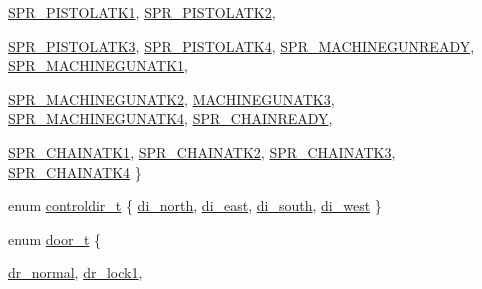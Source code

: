 \begin{DoxyCompactItemize}
\hyperlink{WL__DEF_8H_a99fb83031ce9923c84392b4e92f956b5a3affc11363641bc80d7cc3fbcb9360f4}{SPR\_\-PISTOLATK1}, 
\hyperlink{WL__DEF_8H_a99fb83031ce9923c84392b4e92f956b5a73d35c87d00688985705d0f253f0c116}{SPR\_\-PISTOLATK2}, 
\par
\hyperlink{WL__DEF_8H_a99fb83031ce9923c84392b4e92f956b5afd2c6d43c554d7138673409e5e967cee}{SPR\_\-PISTOLATK3}, 
\hyperlink{WL__DEF_8H_a99fb83031ce9923c84392b4e92f956b5a29b5998a34cf83a8de05db01d9563b8b}{SPR\_\-PISTOLATK4}, 
\hyperlink{WL__DEF_8H_a99fb83031ce9923c84392b4e92f956b5a20895a1570e42d747e9af73ea9748463}{SPR\_\-MACHINEGUNREADY}, 
\hyperlink{WL__DEF_8H_a99fb83031ce9923c84392b4e92f956b5a7c25cc9d5d11185b05590be571c92fe1}{SPR\_\-MACHINEGUNATK1}, 
\par
\hyperlink{WL__DEF_8H_a99fb83031ce9923c84392b4e92f956b5a60c85acce46c9397c50a987fd9695932}{SPR\_\-MACHINEGUNATK2}, 
\hyperlink{WL__DEF_8H_a99fb83031ce9923c84392b4e92f956b5a0a1b3f755ab756458ee2aab3ad418d6a}{MACHINEGUNATK3}, 
\hyperlink{WL__DEF_8H_a99fb83031ce9923c84392b4e92f956b5a05787c4bee4e43314d31cde46cf66875}{SPR\_\-MACHINEGUNATK4}, 
\hyperlink{WL__DEF_8H_a99fb83031ce9923c84392b4e92f956b5a7538fd8a558554269aedc541a947e044}{SPR\_\-CHAINREADY}, 
\par
\hyperlink{WL__DEF_8H_a99fb83031ce9923c84392b4e92f956b5a60783754979f8c1536cc4bb70354f6cb}{SPR\_\-CHAINATK1}, 
\hyperlink{WL__DEF_8H_a99fb83031ce9923c84392b4e92f956b5a02777882b791dfc067d9b1663e47b774}{SPR\_\-CHAINATK2}, 
\hyperlink{WL__DEF_8H_a99fb83031ce9923c84392b4e92f956b5a072a8ebea9630875c44313b59d26fc5a}{SPR\_\-CHAINATK3}, 
\hyperlink{WL__DEF_8H_a99fb83031ce9923c84392b4e92f956b5aa9c2a41e645391dc3ae550b97a353116}{SPR\_\-CHAINATK4}
 \}
\item 
enum \hyperlink{WL__DEF_8H_a865cf1d79fe4e3253162a210948e63a2}{controldir\_\-t} \{ \hyperlink{WL__DEF_8H_a865cf1d79fe4e3253162a210948e63a2a10a7ba4bfeaf8a8d64c4a8949d289b01}{di\_\-north}, 
\hyperlink{WL__DEF_8H_a865cf1d79fe4e3253162a210948e63a2afbfcac8c3c9e5741cd6975c06e52215b}{di\_\-east}, 
\hyperlink{WL__DEF_8H_a865cf1d79fe4e3253162a210948e63a2abe0825b6fb3359b86703cd8d0f3241bd}{di\_\-south}, 
\hyperlink{WL__DEF_8H_a865cf1d79fe4e3253162a210948e63a2a1bcf5bd279788791491fd392bf961683}{di\_\-west}
 \}
\item 
enum \hyperlink{WL__DEF_8H_ae7a79e88d2ac852778ad0240f9073044}{door\_\-t} \{ \par
\hyperlink{WL__DEF_8H_ae7a79e88d2ac852778ad0240f9073044a8dd5bac2b4a91723c5de0d2a4b4017a5}{dr\_\-normal}, 
\hyperlink{WL__DEF_8H_ae7a79e88d2ac852778ad0240f9073044a0eaa0b7c81182c98a3a0567a5ea8bf20}{dr\_\-lock1}, 

\end{DoxyCompactItemize}
